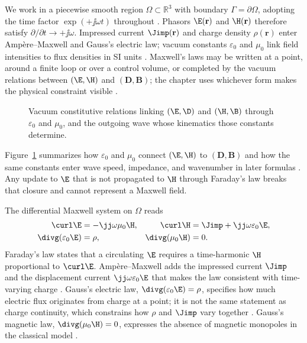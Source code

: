 We work in a piecewise smooth region $\Omega\subset\mathbb{R}^{3}$ with boundary $\Gamma=\partial\Omega$, adopting the time factor $\exp(+\jj\omega t)$ throughout \cite{stratton1941}. Phasors $\E(\mathbf{r})$ and $\H(\mathbf{r})$ therefore satisfy $\partial/\partial t\to +\jj\omega$. Impressed current $\Jimp(\mathbf{r})$ and charge density $\rho(\mathbf{r})$ enter Amp\`ere--Maxwell and Gauss's electric law; vacuum constants $\varepsilon_0$ and $\mu_0$ link field intensities to flux densities in SI units \cite{stratton1941,harrington2001}. Maxwell's laws may be written at a point, around a finite loop or over a control volume, or completed by the vacuum relations between $(\E,\H)$ and $(\mathbf{D},\mathbf{B})$; the chapter uses whichever form makes the physical constraint visible \cite{stratton1941}.

\begin{figure}[t]
\centering
\VolIPhysFig{\VolIPhysVacuumClosureMap}
\caption{Vacuum constitutive relations linking $(\E,\D)$ and $(\H,\B)$ through $\varepsilon_0$ and $\mu_0$, and the outgoing wave whose kinematics those constants determine.}
\label{fig:ch1.vacuum-closure-map}
\end{figure}
Figure~\ref{fig:ch1.vacuum-closure-map} summarizes how $\varepsilon_0$ and $\mu_0$ connect $(\E,\H)$ to $(\mathbf{D},\mathbf{B})$ and how the same constants enter wave speed, impedance, and wavenumber in later formulas \cite{maxwell1873,stratton1941}. Any update to $\E$ that is not propagated to $\H$ through Faraday's law breaks that closure and cannot represent a Maxwell field.

The differential Maxwell system on $\Omega$ reads
\begin{equation}
\label{eq:ch1.maxwell-local}
\begin{aligned}
\curl \E&=-\jj\omega\mu_0\H, &
\curl \H&=\Jimp+\jj\omega\varepsilon_0\E,\\
\divg\!\left(\varepsilon_0\E\right)&=\rho, &
\divg\!\left(\mu_0\H\right)&=0.
\end{aligned}
\end{equation}
Faraday's law states that a circulating $\E$ requires a time-harmonic $\H$ proportional to $\curl\E$. Amp\`ere--Maxwell adds the impressed current $\Jimp$ and the displacement current $\jj\omega\varepsilon_0\E$ that makes the law consistent with time-varying charge \cite{maxwell1873}. Gauss's electric law, $\divg(\varepsilon_0\E)=\rho$, specifies how much electric flux originates from charge at a point; it is not the same statement as charge continuity, which constrains how $\rho$ and $\Jimp$ vary together \cite{stratton1941}. Gauss's magnetic law, $\divg(\mu_0\H)=0$, expresses the absence of magnetic monopoles in the classical model \cite{maxwell1873}.

